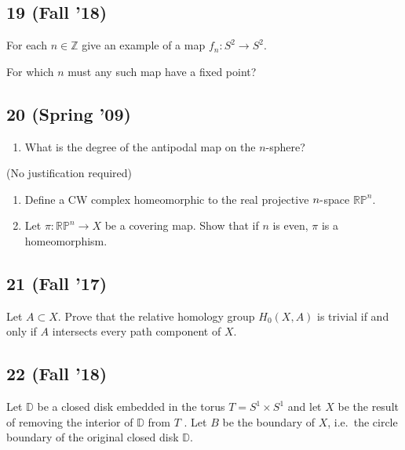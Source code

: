 \hypertarget{fall-18-6}{%
\subsection{19 (Fall '18)}\label{fall-18-6}}

For each \(n \in {\mathbb{Z}}\) give an example of a map
\(f_n : S^2 \to S^2\).

For which \(n\) must any such map have a fixed point?

\hypertarget{spring-09-6}{%
\subsection{20 (Spring '09)}\label{spring-09-6}}

\begin{enumerate}
\def\labelenumi{\alph{enumi}.}
\tightlist
\item
  What is the degree of the antipodal map on the \(n\)-sphere?
\end{enumerate}

(No justification required)

\begin{enumerate}
\def\labelenumi{\alph{enumi}.}
\setcounter{enumi}{1}
\item
  Define a CW complex homeomorphic to the real projective
  \(n{\hbox{-}}\)space \({\mathbb{RP}}^n\).
\item
  Let \(\pi : {\mathbb{RP}}^n \to X\) be a covering map. Show that if
  \(n\) is even, \(\pi\) is a homeomorphism.
\end{enumerate}

\hypertarget{fall-17-4}{%
\subsection{21 (Fall '17)}\label{fall-17-4}}

Let \(A \subset X\). Prove that the relative homology group
\(H_0 (X, A)\) is trivial if and only if \(A\) intersects every path
component of \(X\).

\hypertarget{fall-18-7}{%
\subsection{22 (Fall '18)}\label{fall-18-7}}

Let \({\mathbb{D}}\) be a closed disk embedded in the torus
\(T = S^1 \times S^1\) and let \(X\) be the result of removing the
interior of \({\mathbb{D}}\) from \(T\) . Let \(B\) be the boundary of
\(X\), i.e.~the circle boundary of the original closed disk
\({\mathbb{D}}\).

